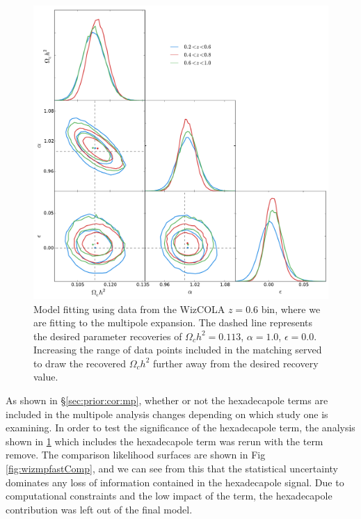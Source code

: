 \documentclass[titlesmallcaps, examinerscopy, copyrightpage]{uqthesis}
\begin{document}
\begin{figure}[h!]
  \begin{center}
    \includegraphics[width=\textwidth]{images/wizmp.pdf}
  \end{center}
  \caption{Model fitting using data from the WizCOLA $z=0.6$ bin, where we are fitting to the multipole expansion. The dashed line represents the desired parameter recoveries of $\Omega_c h^2 = 0.113$, $\alpha=1.0$, $\epsilon=0.0$. Increasing the range of data points included in the matching served to draw the recovered $\Omega_c h^2$ further away from the desired recovery value.}
  \label{fig:wizmp}
\end{figure}

As shown in \S\ref{sec:prior:cor:mp}, whether or not the hexadecapole terms are included in the multipole analysis changes depending on which study one is examining. In order to test the significance of the hexadecapole term, the analysis shown in \ref{fig:wizmp} which includes the hexadecapole term was rerun with the term remove. The comparison likelihood surfaces are shown in Fig \ref{fig:wizmpfastComp}, and we can see from this that the statistical uncertainty dominates any loss of information contained in the hexadecapole signal. Due to computational constraints and the low impact of the term, the hexadecapole contribution was left out of the final model.
\end{document}

